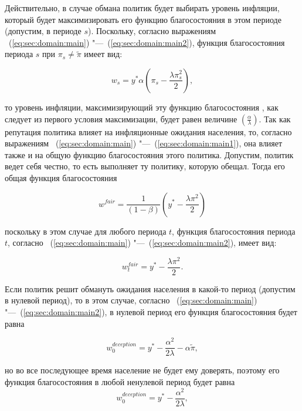 Действительно, в случае обмана политик будет выбирать уровень инфляции, который будет максимизировать его функцию благосостояния в этом периоде (допустим, в периоде $s$). Поскольку, согласно выражениям  ~(\ref{eq:sec:domain:main}) "---~(\ref{eq:sec:domain:main2}), функция благосостояния периода $s$ при $\pi_s\ne\tilde{\pi}$ имеет вид:

\begin{equation}
	\label{eq:sec:domain:main3}
	w_s=y^*\alpha\left(\pi_s - \frac{\lambda\pi^2_s}{2} \right),
\end{equation}

то уровень инфляции, максимизирующий эту функцию благосостояния , как следует из первого условия максимизации, будет равен величине $\left(\frac{\alpha}{\lambda} \right)$.
Так как репутация политика влияет на инфляционные ожидания населения, то, согласно выражениям ~(\ref{eq:sec:domain:main}) "---~(\ref{eq:sec:domain:main1}), она влияет также и на общую функцию благосостояния этого политика.
Допустим, политик ведет себя честно, то есть выполняет ту политику, которую обещал. Тогда его общая функция благосостояния

\begin{equation}
	w^{fair} = \frac{1}{(1-\beta)} \left( y^*-\frac{\lambda\pi^2}{2} \right)
\end{equation}

поскольку в этом случае для любого периода $t$, функция благосостояния периода $t$, согласно ~(\ref{eq:sec:domain:main}) "---~(\ref{eq:sec:domain:main2}), имеет вид:

\begin{equation}
w^{fair}_t = y^*-\frac{\lambda\pi^2}{2}.
\end{equation}

Если политик решит обмануть ожидания населения в какой-то период (допустим в нулевой период), то в этом случае, согласно ~(\ref{eq:sec:domain:main}) "---~(\ref{eq:sec:domain:main2}), в нулевой период его функция благосостояния будет равна

\begin{equation}
w^{deception}_0 = y^*-\frac{\alpha^2}{2\lambda}-\alpha\tilde{\pi},
\end{equation}

но во все последующее время население не будет ему доверять, поэтому его функция благосостояния в любой ненулевой период будет равна
\begin{equation}
w^{deception}_0 = y^*-\frac{\alpha^2}{2\lambda},
\end{equation}

